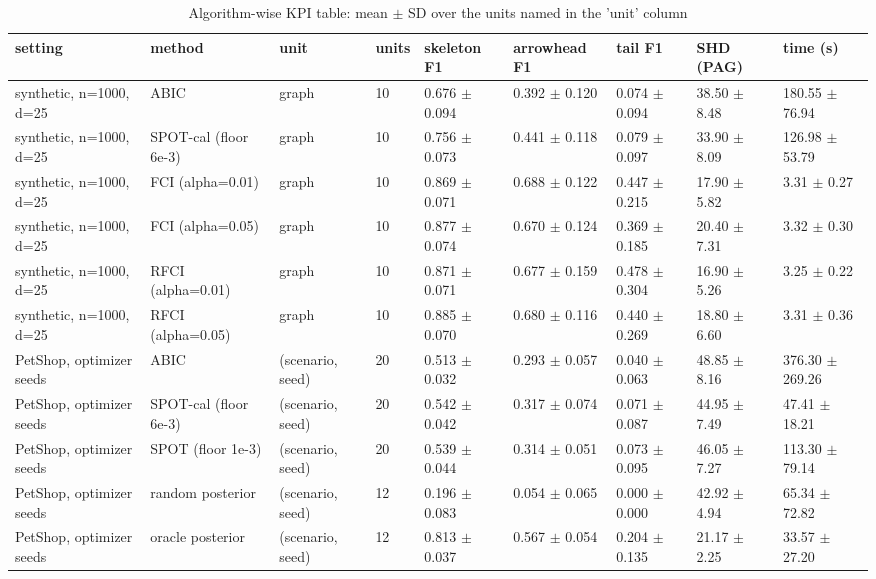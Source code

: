 \begin{table}[t]
\centering\footnotesize
\caption{Algorithm-wise KPI table: mean $\pm$ SD over the units named in the 'unit' column}\label{tab:T1_algorithm_kpi}
\begin{tabular}{@{}lllllllll@{}}
\toprule
setting & method & unit & units & skeleton F1 & arrowhead F1 & tail F1 & SHD (PAG) & time (s)\\
\midrule
synthetic, n=1000, d=25 & ABIC & graph & 10 & 0.676 $\pm$ 0.094 & 0.392 $\pm$ 0.120 & 0.074 $\pm$ 0.094 & 38.50 $\pm$ 8.48 & 180.55 $\pm$ 76.94\\
synthetic, n=1000, d=25 & SPOT-cal (floor 6e-3) & graph & 10 & 0.756 $\pm$ 0.073 & 0.441 $\pm$ 0.118 & 0.079 $\pm$ 0.097 & 33.90 $\pm$ 8.09 & 126.98 $\pm$ 53.79\\
synthetic, n=1000, d=25 & FCI (alpha=0.01) & graph & 10 & 0.869 $\pm$ 0.071 & 0.688 $\pm$ 0.122 & 0.447 $\pm$ 0.215 & 17.90 $\pm$ 5.82 & 3.31 $\pm$ 0.27\\
synthetic, n=1000, d=25 & FCI (alpha=0.05) & graph & 10 & 0.877 $\pm$ 0.074 & 0.670 $\pm$ 0.124 & 0.369 $\pm$ 0.185 & 20.40 $\pm$ 7.31 & 3.32 $\pm$ 0.30\\
synthetic, n=1000, d=25 & RFCI (alpha=0.01) & graph & 10 & 0.871 $\pm$ 0.071 & 0.677 $\pm$ 0.159 & 0.478 $\pm$ 0.304 & 16.90 $\pm$ 5.26 & 3.25 $\pm$ 0.22\\
synthetic, n=1000, d=25 & RFCI (alpha=0.05) & graph & 10 & 0.885 $\pm$ 0.070 & 0.680 $\pm$ 0.116 & 0.440 $\pm$ 0.269 & 18.80 $\pm$ 6.60 & 3.31 $\pm$ 0.36\\
PetShop, optimizer seeds & ABIC & (scenario, seed) & 20 & 0.513 $\pm$ 0.032 & 0.293 $\pm$ 0.057 & 0.040 $\pm$ 0.063 & 48.85 $\pm$ 8.16 & 376.30 $\pm$ 269.26\\
PetShop, optimizer seeds & SPOT-cal (floor 6e-3) & (scenario, seed) & 20 & 0.542 $\pm$ 0.042 & 0.317 $\pm$ 0.074 & 0.071 $\pm$ 0.087 & 44.95 $\pm$ 7.49 & 47.41 $\pm$ 18.21\\
PetShop, optimizer seeds & SPOT (floor 1e-3) & (scenario, seed) & 20 & 0.539 $\pm$ 0.044 & 0.314 $\pm$ 0.051 & 0.073 $\pm$ 0.095 & 46.05 $\pm$ 7.27 & 113.30 $\pm$ 79.14\\
PetShop, optimizer seeds & random posterior & (scenario, seed) & 12 & 0.196 $\pm$ 0.083 & 0.054 $\pm$ 0.065 & 0.000 $\pm$ 0.000 & 42.92 $\pm$ 4.94 & 65.34 $\pm$ 72.82\\
PetShop, optimizer seeds & oracle posterior & (scenario, seed) & 12 & 0.813 $\pm$ 0.037 & 0.567 $\pm$ 0.054 & 0.204 $\pm$ 0.135 & 21.17 $\pm$ 2.25 & 33.57 $\pm$ 27.20\\

\end{tabular}
\end{table}

